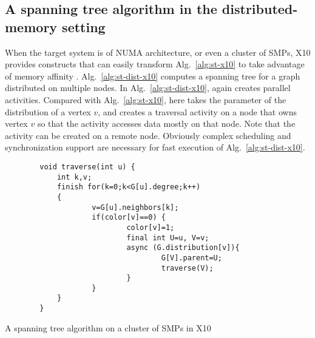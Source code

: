 \subsection{A spanning tree algorithm in the distributed-memory setting}
\label{s:trav-dist}

 When the target system is of NUMA architecture, or even a cluster of SMPs, X10 provides constructs that can easily transform Alg.~\ref{alg:st-x10} to take advantage of memory affinity . Alg.~\ref{alg:st-dist-x10} computes a spanning tree for a graph distributed on multiple nodes. In Alg.~\ref{alg:st-dist-x10}, again \async creates parallel activities. Compared with Alg.~\ref{alg:st-x10}, here \async takes the parameter of the distribution of a vertex $v$, and creates a traversal activity on a node that owns vertex $v$ so that the activity accesses data mostly on that node. Note that the activity can be created on a remote node. Obviously complex scheduling and synchronization support are necessary for fast execution of Alg.~\ref{alg:st-dist-x10}.
 
\begin{algorithm}
\begin{verbatim} 
        void traverse(int u) {
            int k,v;
            finish for(k=0;k<G[u].degree;k++)
            {
                    v=G[u].neighbors[k];
                    if(color[v]==0) {
                            color[v]=1;
                            final int U=u, V=v;
                            async (G.distribution[v]){
                                    G[V].parent=U;
                                    traverse(V);
                            }
                    }
            }
        }
\end{verbatim}
\caption{A spanning tree algorithm on a cluster of SMPs in X10}
\label{alg:st-dist-x10}
\end{algorithm}


